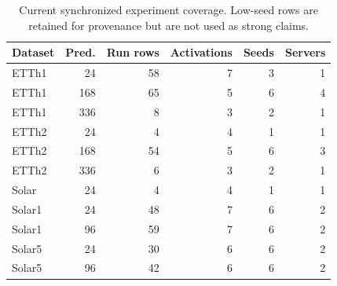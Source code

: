 \begin{table}[t]
\centering
\caption{Current synchronized experiment coverage. Low-seed rows are retained for provenance but are not used as strong claims.}
\label{tab:dataset_coverage}
\begin{tabular}{lrrrrr}
\toprule
Dataset & Pred. & Run rows & Activations & Seeds & Servers \\
\midrule
ETTh1 & 24 & 58 & 7 & 3 & 1 \\
ETTh1 & 168 & 65 & 5 & 6 & 4 \\
ETTh1 & 336 & 8 & 3 & 2 & 1 \\
ETTh2 & 24 & 4 & 4 & 1 & 1 \\
ETTh2 & 168 & 54 & 5 & 6 & 3 \\
ETTh2 & 336 & 6 & 3 & 2 & 1 \\
Solar & 24 & 4 & 4 & 1 & 1 \\
Solar1 & 24 & 48 & 7 & 6 & 2 \\
Solar1 & 96 & 59 & 7 & 6 & 2 \\
Solar5 & 24 & 30 & 6 & 6 & 2 \\
Solar5 & 96 & 42 & 6 & 6 & 2 \\
\bottomrule
\end{tabular}
\end{table}
